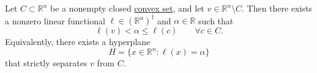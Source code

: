 	\begin{theorem}
	  \label{thm:separating-hyperplane-theorem}
		Let $C \subset \mathbb{R}^n$ be a nonempty closed \hyperref[mv-def:convex-set]{convex set}, and let $v \in \mathbb{R}^n \setminus C$. Then there exists a nonzero linear functional $\ell \in (\mathbb{R}^n)^\dagger$ and $\alpha \in \mathbb{R}$ such that
		\begin{equation}
			\ell(v) < \alpha \leq \ell(c)
			\qquad \forall c \in C.
		\end{equation}
		Equivalently, there exists a hyperplane
		\begin{equation}
			H = \{x \in \mathbb{R}^n \colon \ell(x) = \alpha\}
		\end{equation}
		that strictly separates $v$ from $C$.
	\end{theorem}
